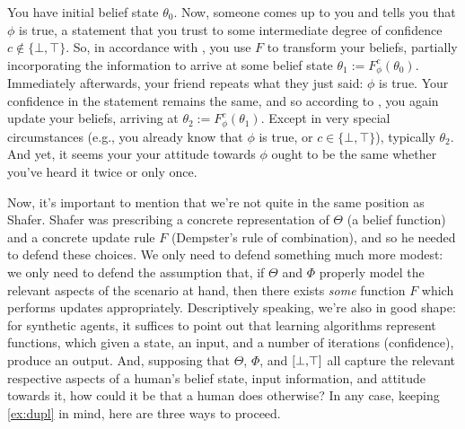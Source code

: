 \begin{subappendices}
    \begin{example}
    	You have initial belief state $\theta_0$.
    	Now, someone comes up to you and tells you that $\phi$ is true, a statement
    		that you trust to some intermediate degree of confidence $c \notin\{ \bot, \top\}$.
    	So, in accordance with , you use $F$ to transform your beliefs, partially incorporating the information to arrive at some belief state $\theta_1 := F^c_\phi(\theta_0)$.
    	Immediately afterwards, your friend repeats what they just said: $\phi$ is true.
    	Your confidence in the statement remains the same, and so according to
    	, you again update your beliefs, arriving at $\theta_2 := F^c_\phi(\theta_1)$.
    	Except in very special circumstances (e.g., you already know that $\phi$ is true, or $c \in \{\bot,\top\}$), typically $\theta_2$.
    	And yet, it seems your your attitude towards $\phi$ ought to be the same whether you've heard it twice or only once.
    \end{example}


    Now, it's important to mention that we're not quite in the same position as Shafer.
    Shafer was prescribing a concrete representation of $\Theta$ (a belief function) and a concrete update rule $F$ (Dempster's rule of combination), and so he needed to defend these choices.
    We only need to defend something much more modest: we only need to defend the assumption that, if $\Theta$ and $\Phi$ properly model the relevant aspects of the scenario at hand, then there exists \emph{some} function $F$ which performs updates appropriately.
    Descriptively speaking, we're also in good shape: for synthetic agents, it suffices to point out that learning algorithms represent functions, which given a state, an input, and a number of iterations (confidence), produce an output.
    And, supposing that $\Theta$, $\Phi$, and $[\bot,\!\top]$ all capture the relevant respective aspects of a human's belief state, input information, and attitude towards it, how could it be that a human does otherwise?
    In any case, keeping \cref{ex:dupl} in mind, here are three ways to proceed.


\end{subappendices}
